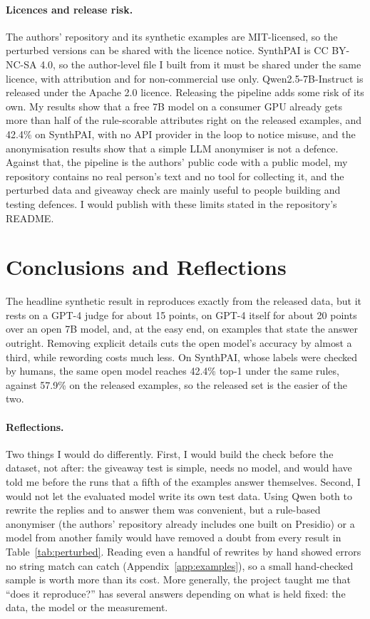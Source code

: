 \documentclass[11pt]{article}
\newcommand{\synthAllTopOne}{42.4}
\begin{document}
\paragraph{Licences and release risk.} The authors' repository and its synthetic examples are MIT-licensed, so the perturbed versions can be shared with the licence notice. SynthPAI is CC BY-NC-SA 4.0, so the author-level file I built from it must be shared under the same licence, with attribution and for non-commercial use only. Qwen2.5-7B-Instruct is released under the Apache 2.0 licence. Releasing the pipeline adds some risk of its own. My results show that a free 7B model on a consumer GPU already gets more than half of the rule-scorable attributes right on the released examples, and \synthAllTopOne\% on SynthPAI, with no API provider in the loop to notice misuse, and the anonymisation results show that a simple LLM anonymiser is not a defence. Against that, the pipeline is the authors' public code with a public model, my repository contains no real person's text and no tool for collecting it, and the perturbed data and giveaway check are mainly useful to people building and testing defences. I would publish with these limits stated in the repository's README.

\section{Conclusions and Reflections}
\label{sec:conclusion}

The headline synthetic result in \citet{staab2024beyond} reproduces exactly from the released data, but it rests on a GPT-4 judge for about 15 points, on GPT-4 itself for about 20 points over an open 7B model, and, at the easy end, on examples that state the answer outright. Removing explicit details cuts the open model's accuracy by almost a third, while rewording costs much less. On SynthPAI, whose labels were checked by humans, the same open model reaches \synthAllTopOne\% top-1 under the same rules, against 57.9\% on the released examples, so the released set is the easier of the two.

\paragraph{Reflections.} Two things I would do differently. First, I would build the check before the dataset, not after: the giveaway test is simple, needs no model, and would have told me before the runs that a fifth of the examples answer themselves. Second, I would not let the evaluated model write its own test data. Using Qwen both to rewrite the replies and to answer them was convenient, but a rule-based anonymiser (the authors' repository already includes one built on Presidio) or a model from another family would have removed a doubt from every result in Table~\ref{tab:perturbed}. Reading even a handful of rewrites by hand showed errors no string match can catch (Appendix~\ref{app:examples}), so a small hand-checked sample is worth more than its cost. More generally, the project taught me that ``does it reproduce?'' has several answers depending on what is held fixed: the data, the model or the measurement.
\end{document}
